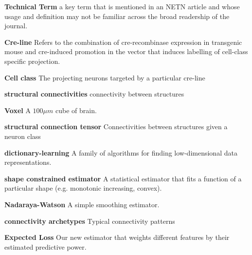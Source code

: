 \documentclass[NETN,manuscript]{stjour-new}
\begin{document}
\textbf{Technical Term} a key term that is mentioned in an NETN article and whose usage and definition may not be familiar across the broad readership of the journal. 


\textbf{Cre-line}  Refers to the combination of cre-recombinase expression in transgenic mouse and cre-induced promotion in the vector that induces labelling of cell-class specific projection. 

\textbf{Cell class} The projecting neurons targeted by a particular cre-line 

\textbf{structural connectivities}  connectivity between structures 

\textbf{Voxel} A $100 \mu m$ cube of brain. 

\textbf{structural connection tensor}  Connectivities between structures given a neuron class

\textbf{dictionary-learning} A family of algorithms for finding low-dimensional data representations.

\textbf{shape constrained estimator} A statistical estimator that fits a function of a particular shape (e.g. monotonic increasing, convex).

\textbf{Nadaraya-Watson} A simple smoothing estimator.

\textbf{connectivity archetypes} Typical connectivity patterns

 \textbf{Expected Loss} Our new estimator that weights different features by their estimated predictive power.
 


\end{document}
